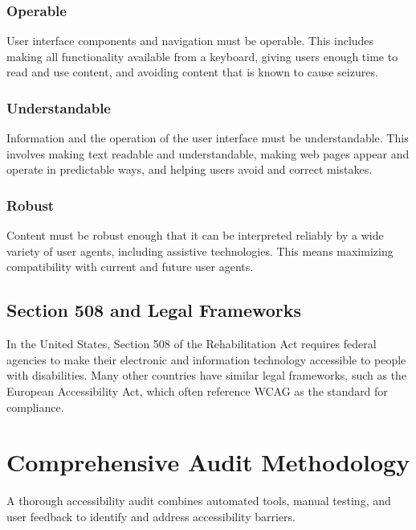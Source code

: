 \subsubsection{Operable}
\label{ssubsec:operable}
User interface components and \gls{navigation} must be operable. This includes making all functionality available from a keyboard, giving users enough time to read and use content, and avoiding content that is known to cause seizures.
\supercite{WebAIMKeyboardA11y}

\subsubsection{Understandable}
\label{ssubsec:understandable}
Information and the operation of the user interface must be understandable. This involves making text readable and understandable, making web pages appear and operate in predictable ways, and helping users avoid and correct mistakes.
\supercite{Redish2012}

\subsubsection{Robust}
\label{ssubsec:robust}
Content must be robust enough that it can be interpreted reliably by a wide variety of user agents, including assistive technologies. This means maximizing compatibility with current and future user agents.
\supercite{WCAGPrincipleRobust}

\subsection{Section 508 and Legal Frameworks}
\label{subsec:section508-legal}
In the United States, Section 508 of the Rehabilitation Act requires federal agencies to make their electronic and information technology accessible to people with disabilities. Many other countries have similar legal frameworks, such as the European Accessibility Act, which often reference WCAG as the standard for compliance.
\supercite{Section5082018, Jaeger2006}

\section{Comprehensive Audit Methodology}
\label{sec:audit-methodology}
A thorough accessibility audit combines automated tools, manual testing, and user feedback to identify and address accessibility barriers.
\supercite{Henry2007}


